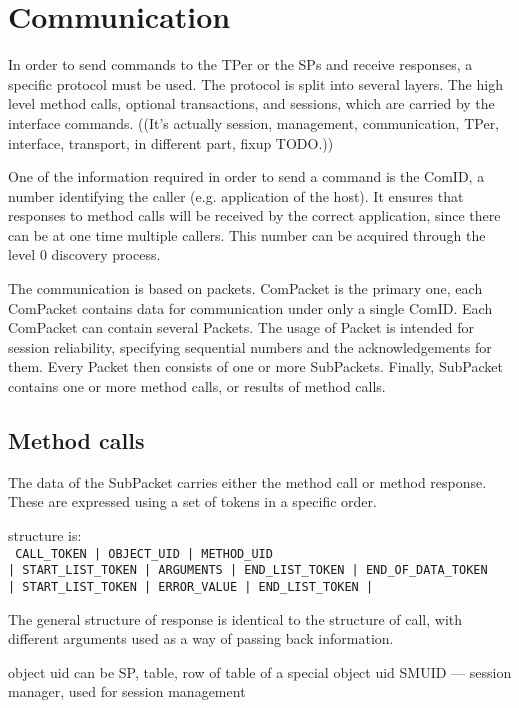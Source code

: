 \section{Communication}

In order to send commands to the TPer or the SPs and receive responses, a specific protocol must be used. %
The protocol is split into several layers. The high level method calls, optional transactions, and sessions, which are carried by the interface commands.
((It's actually session, management, communication, TPer, interface, transport, in different part, fixup TODO.))

One of the information required in order to send a command is the ComID, a number identifying the caller (e.g. application of the host). It ensures that responses to method calls will be received by the correct application, since there can be at one time multiple callers. This number can be acquired through the level 0 discovery process.

The communication is based on packets. ComPacket is the primary one, each ComPacket contains data for communication under only a single ComID. Each ComPacket can contain several Packets. The usage of Packet is intended for session reliability, specifying sequential numbers and the acknowledgements for them. Every Packet then consists of one or more SubPackets. Finally, SubPacket contains one or more method calls, or results of method calls.


\subsection{Method calls}

The data of the SubPacket carries either the method call or method response. %
These are expressed using a set of tokens in a specific order.

structure is: \\
\verb# CALL_TOKEN | OBJECT_UID | METHOD_UID# \\
\verb#| START_LIST_TOKEN | ARGUMENTS | END_LIST_TOKEN | END_OF_DATA_TOKEN# \\
\verb#| START_LIST_TOKEN | ERROR_VALUE | END_LIST_TOKEN | #

The general structure of response is identical to the structure of call, with different arguments used as a way of passing back information.

object uid can be SP, table, row of table of a special object uid SMUID --- session manager, used for session management

